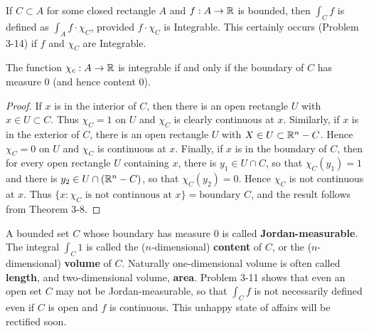 If $C\subset A$ for some closed rectangle $A$ and $f:A\to \mathbb{R}$ is bounded, then 
$\int_{C }^{}{f}$ is defined as $\int_A f\cdot \chi_C$, provided $f\cdot \chi_C$ is 
Integrable. This certainly occurs (Problem 3-14) if $f$ and $\chi_C$ are Integrable.

\begin{theorem}
    The function $\chi_c: A\to \mathbb{R}$ is integrable if and
    only if the boundary of $C$ has measure 0 (and hence content 0).
\end{theorem}

\begin{proof}
    If $x$ is in the interior of $C$, then there is an open
    rectangle $U$ with $x \in U \subset C$. Thus $\chi_C = 1$ on $U$ and $\chi_C$ is
    clearly continuous at $x$. Similarly, if $x$ is in the exterior of $C$,
    there is an open rectangle $U$ with $X \in U \subset \mathbb{R}^n - C$. Hence
    $\chi_C = 0$ on $U$ and $\chi_C$ is continuous at $x$.
    Finally, if $x$ is in the boundary of $C$, then for every open rectangle $U$ containing
    $x$, there is $y_1 \in U \cap C$, so that $\chi_C(y_1) = 1$ and there is
    $y_2 \in U \cap (\mathbb{R}^n - C)$, so that $\chi_C(y_2) = 0$.
    Hence $\chi_C$ is not continuous at $x$. Thus $\{x: \chi_C \text{ is not continuous at } x\}
    =\text{boundary } C$, and the result follows from Theorem 3-8.
\end{proof}

A bounded set $C$ whose boundary has measure 0 is called
\textbf{Jordan-measurable}. The integral $\int_C1$ is called the ($n$-dimensional) 
\textbf{content} of $C$, or the ($n$-dimensional) \textbf{volume} of $C$.
Naturally one-dimensional volume is often called \textbf{length}, and two-dimensional 
volume, \textbf{area}. Problem 3-11 shows that even an open set $C$ may not be
Jordan-measurable, so that $\int_Cf$ is not necessarily defined even if $C$ is open 
and $f$ is continuous. This unhappy state of affairs will be rectified soon.


